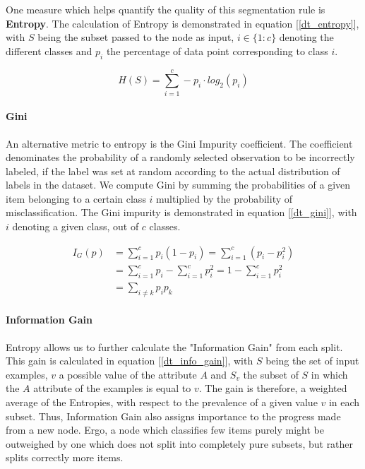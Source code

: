 		\par
		One measure which helps quantify the quality of this segmentation rule is \textbf{Entropy}. The calculation of Entropy is demonstrated in equation [\ref{dt_entropy}], with $ S $ being the subset passed to the node as input, $ i \in \{1:c \} $ denoting the different classes and $ p_i $ the percentage of data point corresponding to class $ i $. 
		
		\begin{equation}
			H(S) = \sum_{i=1}^c - p_i \cdot log_2 (p_i)
			\label{dt_entropy}
		\end{equation}
		
	 \paragraph{Gini}
	 	An alternative metric to entropy is the Gini Impurity coefficient. The coefficient denominates the probability of a randomly selected observation to be incorrectly labeled, if the label was set at random according to the actual distribution of labels in the dataset. We compute Gini by summing the probabilities of a given item belonging to a certain class $ i $ multiplied by the probability of misclassification. The Gini impurity is demonstrated in equation [\ref{dt_gini}], with $ i $ denoting a given class, out of $ c $ classes.
	 	
	 \begin{equation}
	 	\begin{aligned}
		 	I_G(p) &= \sum_{i=1}^c p_i(1-p_i) = \sum_{i=1}^c (p_i-p_i^2) \\  &=\sum_{i=1}^c p_i - \sum_{i=1}^c p_i^2 = 1 - \sum_{i=1}^c p_i^2 \\ &= \sum_{i \neq k} p_i p_k
	 	\end{aligned}
		\label{dt_gini}
	 \end{equation}
	 
	 \paragraph{Information Gain}	
	 	Entropy allows us to further calculate the "Information Gain" from each split. This gain is calculated in equation [\ref{dt_info_gain}], with $ S $ being the set of input examples, $ v $ a possible value of the attribute $ A $ and $ S_v $ the subset of $ S $ in which the $ A $ attribute of the examples is equal to $ v $. The gain is therefore, a weighted average of the Entropies, with respect to the prevalence of a given value $ v $ in each subset. Thus, Information Gain also assigns importance to the progress made from a new node. Ergo, a node which classifies few items purely might be outweighed by one which does not split into completely pure subsets, but rather splits correctly more items.
	 
